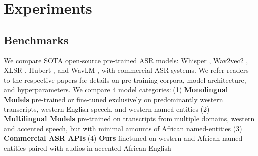 \documentclass{INTERSPEECH2023}
\begin{document}


\section{Experiments}


\subsection{Benchmarks}\label{section:benchmarks}
We compare SOTA open-source pre-trained ASR models: Whisper \cite{radford2022robust}, Wav2vec2 \cite{baevski2020wav2vec}, XLSR \cite{grosman2021xlsr53-large-english}, Hubert \cite{hsu2021hubert}, and WavLM \cite{chen2022wavlm}, with commercial ASR systems. We refer readers to the respective papers for details on pre-training corpora, model architecture, and hyperparameters. We compare 4 model categories: (1) \textbf{Monolingual Models} pre-trained or fine-tuned exclusively on predominantly western transcripts, western English speech, and western named-entities (2) \textbf{Multilingual Models} pre-trained on transcripts from multiple domains, western and accented speech, but with minimal amounts of African named-entities (3) \textbf{Commercial ASR APIs} (4) \textbf{Ours} finetuned on western and African-named entities paired with audios in accented African English.

\end{document}
